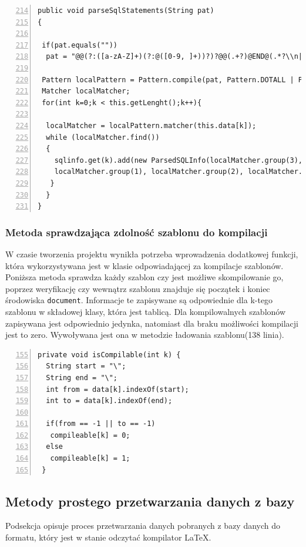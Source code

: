  \begin{lstlisting}[numbers=left,firstnumber=214]
public void parseSqlStatements(String pat)
{

 if(pat.equals(""))
  pat = "@@(?:([a-zA-Z]+)(?:@([0-9, ]+))?)?@@(.+?)@END@(.*?\\n|.*)";
    
 Pattern localPattern = Pattern.compile(pat, Pattern.DOTALL | Pattern.MULTILINE);
 Matcher localMatcher;
 for(int k=0;k < this.getLenght();k++){

  localMatcher = localPattern.matcher(this.data[k]);
  while (localMatcher.find())
  {
    sqlinfo.get(k).add(new ParsedSQLInfo(localMatcher.group(3),
    localMatcher.group(1), localMatcher.group(2), localMatcher.end()));
   }
  }
}
  \end{lstlisting}
   
\subsubsection*{Metoda sprawdzająca zdolność szablonu do kompilacji}

W czasie tworzenia projektu wynikła potrzeba wprowadzenia dodatkowej funkcji, która wykorzystywana jest w klasie odpowiadającej za kompilacje szablonów. Poniższa metoda sprawdza każdy szablon czy jest możliwe skompilowanie go, poprzez weryfikację czy wewnątrz szablonu znajduje się początek i koniec środowiska \texttt{document}. Informacje te zapisywane są odpowiednie dla k-tego szablonu w składowej klasy, która jest tablicą. Dla kompilowalnych szablonów zapisywana jest odpowiednio jedynka, natomiast dla braku możliwości kompilacji jest to zero. Wywoływana jest ona w metodzie ładowania szablonu(138 linia).

 \begin{lstlisting}[numbers=left,firstnumber=155]
 private void isCompilable(int k) {
  String start = "\";
  String end = "\";
  int from = data[k].indexOf(start);
  int to = data[k].indexOf(end);
        
  if(from == -1 || to == -1)
   compileable[k] = 0;
  else
   compileable[k] = 1;
 }
  \end{lstlisting}
  
\subsection{Metody prostego przetwarzania danych z bazy}

Podsekcja opisuje proces przetwarzania danych pobranych z bazy danych do formatu, który jest w stanie odczytać kompilator LaTeX.

